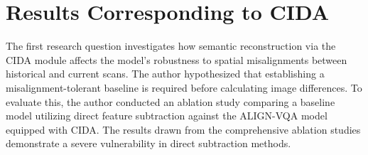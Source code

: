 \begin{table}[htbp]
	\centering
	\caption{Evaluation scores across different clinical question types using the best performing ALIGN-VQA model (Top-16, CIDA-active, Gate-active).}
	\label{tab:question_types}
	\renewcommand{\arraystretch}{1.2}
\end{table}



\section{Results Corresponding to CIDA}
The first research question investigates how semantic reconstruction via the CIDA module affects the model's robustness to spatial misalignments between historical and current scans. The author hypothesized that establishing a misalignment-tolerant baseline is required before calculating image differences. To evaluate this, the author conducted an ablation study comparing a baseline model utilizing direct feature subtraction against the ALIGN-VQA model equipped with CIDA. The results drawn from the comprehensive ablation studies demonstrate a severe vulnerability in direct subtraction methods.

